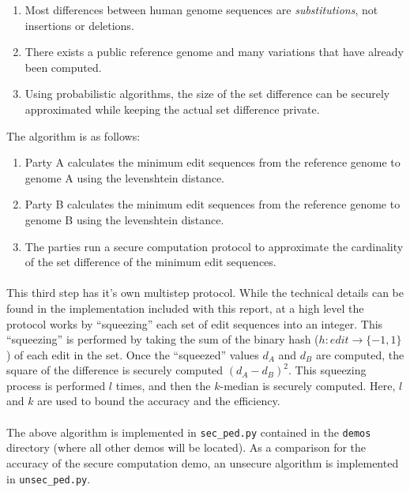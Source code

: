 \begin{enumerate}
\item Most differences between human genome sequences are \textit{substitutions}, not insertions or deletions.
\item There exists a public reference genome and many variations that have already been computed.
\item Using probabilistic algorithms, the size of the set difference can be securely approximated while keeping the actual set difference private.
\end{enumerate}

The algorithm is as follows:

\begin{enumerate}
\item Party A calculates the minimum edit sequences from the reference genome to genome A using the levenshtein distance.
\item Party B calculates the minimum edit sequences from the reference genome to genome B using the levenshtein distance.
\item The parties run a secure computation protocol to approximate the cardinality of the set difference of the minimum edit sequences.
\end{enumerate}

\paragraph{}
This third step has it's own multistep protocol. While the technical details can be found in the implementation included with this report, at a high level the protocol works by ``squeezing'' each set of edit sequences into an integer. This ``squeezing'' is performed by taking the sum of the binary hash ($h : edit \rightarrow \{-1, 1\}$) of each edit in the set. Once the ``squeezed'' values $d_A$ and $d_B$ are computed, the square of the difference is securely computed $(d_A - d_B)^2$. This squeezing process is performed $l$ times, and then the $k$-median is securely computed. Here, $l$ and $k$ are used to bound the accuracy and the efficiency.

\paragraph{}
The above algorithm is implemented in \texttt{sec\_ped.py} contained in the \texttt{demos} directory (where all other demos will be located). As a comparison for the accuracy of the secure computation demo, an unsecure algorithm is implemented in \texttt{unsec\_ped.py}.

